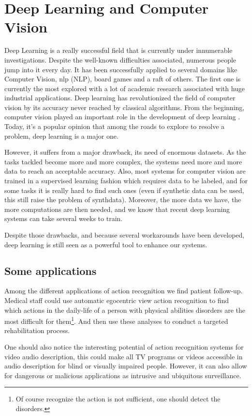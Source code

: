 \documentclass[12pt, a4paper]{report}
\begin{document}
		\section{Deep Learning and Computer Vision}\label{dl_cv}
			Deep Learning is a really successful field that is currently under innumerable investigations.
			Despite the well-known difficulties associated, numerous people jump into it every day.
			It has been successfully applied to several domains like Computer Vision, \gls{nlp} (NLP), board games and a raft of others.
			The first one is currently the most explored with a lot of academic research associated with huge industrial applications.
			Deep learning has revolutionized the field of computer vision by its accuracy never reached by classical algorithms.
			From the beginning, computer vision played an important role in the development of deep learning \cite{lecun_89,lecun_98}.
			Today, it's a popular opinion that among the roads to explore to resolve a problem, deep learning is a major one.\par
			However, it suffers from a major drawback, its need of enormous datasets.
			As the tasks tackled become more and more complex, the systems need more and more data to reach an acceptable accuracy.
			Also, most systems for computer vision are trained in a supervised learning fashion which requires data to be labeled, and for some tasks it is really hard to find such ones (even if synthetic data can be used, this still raise the problem of \gls{synthdata}).
			Moreover, the more data we have, the more computations are then needed, and we know that recent deep learning systems can take several weeks to train.\par
			Despite those drawbacks, and because several workarounds have been developed, deep learning is still seen as a powerful tool to enhance our systems.

			\subsection*{Some applications}
				Among the different applications of action recognition we find patient follow-up.
				Medical staff could use automatic egocentric view action recognition to find which actions in the daily-life of a person with physical abilities disorders are the most difficult for them\footnote{Of course recognize the action is not sufficient, one should detect the disorders.}.
				And then use these analyses to conduct a targeted rehabilitation process.\par
				One should also notice the interesting potential of action recognition systems for video audio description, this could make all TV programs or videos accessible in audio description for blind or visually impaired people.
				However, it can also allow for dangerous or malicious applications as intrusive and ubiquitous surveillance.
\end{document}
